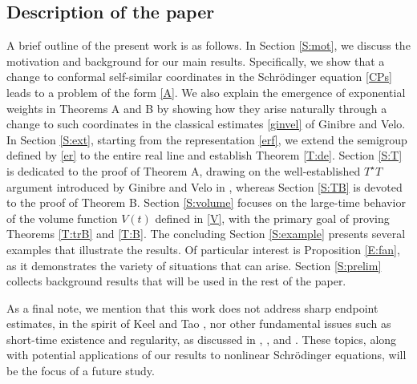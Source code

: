 \documentclass[11pt,letter]{amsart}
\numberwithin{equation}{section}
\numberwithin{equation}{section}
\begin{document}
\medskip


\vskip 0.2in

\subsection{Description of the paper} 
A brief outline of the present work is as follows. In Section \ref{S:mot}, we discuss the motivation and background for our main results. Specifically, we show that a change to conformal self-similar coordinates in the Schr\"odinger equation \eqref{CPs} leads to a problem of the form \eqref{A}. We also explain the emergence of exponential weights in Theorems A and B by showing how they arise naturally through a change to such coordinates in the classical estimates \eqref{ginvel} of Ginibre and Velo.
In Section \ref{S:ext}, starting from the representation \eqref{erf}, we extend the semigroup defined by \eqref{er} to the entire real line and establish Theorem \ref{T:de}. Section \ref{S:T} is dedicated to the proof of Theorem A, drawing on the well-established $T^\star T$ argument introduced by Ginibre and Velo in \cite{GV, GVstrich}, whereas Section \ref{S:TB} is devoted to the proof of Theorem B. Section \ref{S:volume} focuses on the large-time behavior of the volume function 
$V(t)$ defined in \eqref{V}, with the primary goal of proving Theorems \ref{T:trB} and \ref{T:B}. 
The concluding Section \ref{S:example} presents several examples that illustrate the results. Of particular interest is Proposition \ref{E:fan}, as it demonstrates the variety of situations that can arise. Section \ref{S:prelim} collects background results that will be used in the rest of the paper. 





As a final note, we mention that this work does not address sharp endpoint estimates, in the spirit of Keel and Tao \cite{KT}, nor other fundamental issues such as short-time existence and regularity, as discussed in \cite{GV, GVstrich}, \cite{Caze}, and \cite{Tao}. These topics, along with potential applications of our results to nonlinear Schr\"odinger equations, will be the focus of a future study.





 
\end{document}
